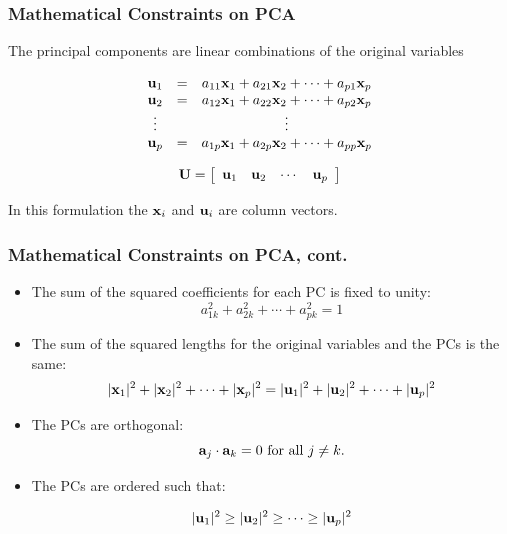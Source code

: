 \documentclass{beamer}
\begin{document}
\begin{frame}
  \frametitle{Mathematical Constraints on PCA}

The principal components are linear combinations of the original variables
\medskip

\[ \begin{array}{ccc}
\mathbf{u}_1 & = & a_{11}\mathbf{x}_1 + a_{21}\mathbf{x}_2 + \cdots + a_{p1}\mathbf{x}_p \\
\mathbf{u}_2 & = & a_{12}\mathbf{x}_1 + a_{22}\mathbf{x}_2 + \cdots + a_{p2}\mathbf{x}_p \\
\vdots & & \vdots \\
\mathbf{u}_p & = & a_{1p}\mathbf{x}_1 + a_{2p}\mathbf{x}_2 + \cdots + a_{pp}\mathbf{x}_p \\
\end{array}
\]

\bigskip

\[
\mathbf{U}  =  \left[ \begin{array}{cccc}
\mathbf{u}_1 & \mathbf{u}_2 & \cdots &  \mathbf{u}_p\\
\end{array} \right]
\]

In this formulation the $\mathbf{x}_i$ and $\mathbf{u}_i$ are column vectors.


\end{frame}

\begin{frame}
  \frametitle{Mathematical Constraints on PCA, cont.}


\begin{itemize}
	\item The sum of the squared coefficients for each PC is fixed to unity:
\[
a_{1k}^2 + a_{2k}^2 + \cdots + a_{pk}^2 = 1
\]

	\item The sum of the squared lengths for the original variables and the PCs is the same:
\[
|\mathbf{x}_1|^2 + |\mathbf{x}_2|^2 + \cdots + |\mathbf{x}_p|^2 = |\mathbf{u}_1|^2 + |\mathbf{u}_2|^2 + \cdots + |\mathbf{u}_p|^2
\]	

	\item The PCs are orthogonal:
\[
\mathbf{a}_j \cdot \mathbf{a}_k = 0 \mbox{ for all } j \neq k.
\]

	\item The PCs are ordered such that:

\[
 |\mathbf{u}_1|^2 \geq |\mathbf{u}_2|^2  \geq \cdots \geq |\mathbf{u}_p|^2
\]

\end{itemize}

\end{frame}
\end{document}
